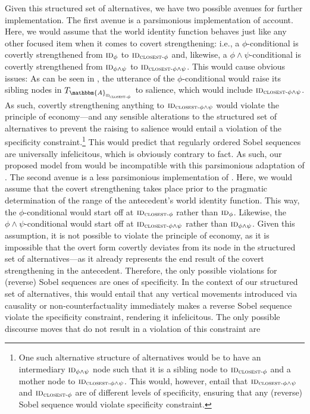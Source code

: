 Given this structured set of alternatives, we have two possible avenues for further implementation. The first avenue is a parsimonious implementation of  account. Here, we would assume that the world identity function behaves just like any other focused item when it comes to covert strengthening: i.e., a $\phi$-conditional is covertly strengthened from $\text{\scshape{id}}_\phi$ to $\text{\scshape{id}}_{\text{\scshape closest-}\phi}$ and, likewise, a $\phi\land\psi$-conditional is covertly strengthened from $\text{\scshape{id}}_{\phi\land\psi}$ to $\text{\scshape{id}}_{\text{\scshape closest-}\phi\land\psi}$. This would cause obvious issues: As can be seen in , the utterance of the $\phi$-conditional would raise its sibling nodes in $T_{\mathbbm{A}_\text{{\scshape id\textsubscript{closest-$\phi$}}}}$ to salience, which would include $\text{\scshape{id}}_{\text{\scshape closest-}\phi\land\psi}$. As such, covertly strengthening anything to $\text{\scshape{id}}_{\text{\scshape closest-}\phi\land\psi}$ would violate the principle of economy---and any sensible alterations to the structured set of alternatives to prevent the raising to salience would entail a violation of the specificity constraint.\footnote{One such alternative structure of alternatives would be to have an intermediary $\text{\scshape{id}}_{\phi\land\psi}$ node such that it is a sibling node to $\text{\scshape{id}}_{\text{\scshape closest-}\phi}$ and a mother node to $\text{\scshape{id}}_{\text{\scshape closest-}\phi\land\psi}$. This would, however, entail that $\text{\scshape{id}}_{\text{\scshape closest-}\phi\land\psi}$ and $\text{\scshape{id}}_{\text{\scshape closest-}\phi}$ are of different levels of specificity, ensuring that any (reverse) Sobel sequence would violate  specificity constraint.} This would predict that regularly ordered Sobel sequences are universally infelicitous, which is obviously contrary to fact. As such, our proposed model from  would be incompatible with this parsimonious adaptation of \textcite{Ippolito2020}. The second avenue is a less parsimonious implementation of \textcite{Ippolito2020}. Here, we would assume that the covert strengthening takes place prior to the pragmatic determination of the range of the antecedent's world identity function. This way, the $\phi$-conditional would start off at $\text{\scshape{id}}_{\text{\scshape closest-}\phi}$ rather than $\text{\scshape{id}}_{\phi}$. Likewise, the $\phi\land\psi$-conditional would start off at $\text{\scshape{id}}_{\text{\scshape closest-}\phi\land\psi}$ rather than $\text{\scshape{id}}_{\phi\land\psi}$. Given this assumption, it is not possible to violate the principle of economy, as it is impossible that the overt form covertly deviates from its node in the structured set of alternatives---as it already represents the end result of the covert strengthening in the antecedent. Therefore, the only possible violations for (reverse) Sobel sequences are ones of specificity. In the context of our structured set of alternatives, this would entail that any vertical movements introduced via causality or non-counterfactuality immediately makes a reverse Sobel sequence violate the specificity constraint, rendering it infelicitous. The only possible discourse moves that do not result in a violation of this constraint are 